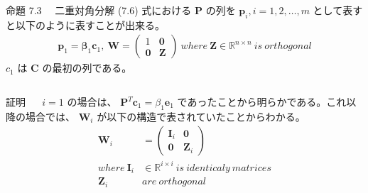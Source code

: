 \documentclass[dvipdfmx,10pt,presentation]{beamer}
\begin{document}
\begin{frame}[allowframebreaks]{}
\begin{columns}
\begin{column}{1.00\columnwidth}
\begin{block}{命題 7.3}
　二重対角分解 (7.6) 式における \(\bm{P}\) の列を \(\bm{p}_i,i=1,2,\dots,m\) として表すと以下のように表すことが出来る。\\
\begin{align*}
\bm{p}_1 = \bm{\beta}_1 \bm{c}_1,\ \bm{W} = 
\begin{pmatrix}
1 & \bm{0}\\
\bm{0} & \bm{Z}
\end{pmatrix}
\ where\ \bm{Z}\in\mathbb{R}^{n \times n}\ is\ orthogonal
\end{align*}
\(c_1\) は \(\bm{C}\) の最初の列である。\\
\end{block}
\end{column}
\end{columns}
\end{frame}
\begin{frame}[label={sec:orgbbaefb3}]{}
\begin{columns}
\begin{column}{1.00\columnwidth}
\begin{block}{証明}
　 \(i = 1\) の場合は、 \(\bm{P}^T \bm{c}_1 = \beta_1 \bm{e}_1\) であったことから明らかである。これ以降の場合では、 \(\bm{W}_i\) が以下の構造で表されていたことからわかる。\\
\begin{align*}
\bm{W}_i &=
\begin{pmatrix}
\bm{I}_i & \bm{0}\\
\bm{0} & \bm{Z}_i 
\end{pmatrix} \\
where\ \bm{I}_i &\in \mathbb{R}^{i \times i}\ is\ identicaly\ matrices \\
\bm{Z}_i &are \ orthogonal
\end{align*}
\end{block}
\end{column}
\end{columns}
\end{frame}
\end{document}
